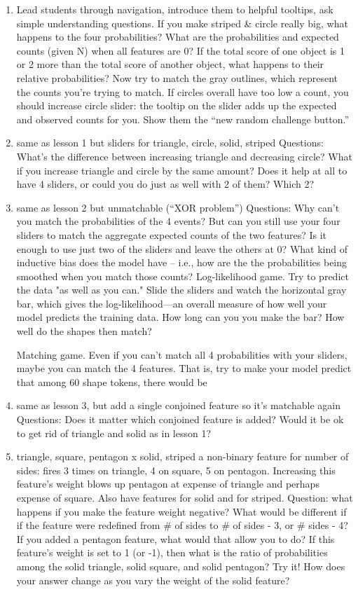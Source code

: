 \documentclass[11pt,letterpaper]{article}
\begin{document}
{\begin{enumerate}
\item 
 Lead students through navigation, introduce them to helpful tooltips, ask simple understanding questions. If you make striped \& circle really big, what happens to the four probabilities?  What are the probabilities and expected counts (given N) when all features are 0?  If the total score of one object is 1 or 2 more than the total score of another object, what happens to their relative probabilities? Now try to match the gray outlines, which represent the counts you’re trying to match.  If circles overall have too low a count, you should increase circle slider: the tooltip on the slider adds up the expected and observed counts for you.  Show them the “new random challenge button.”  
\item same as lesson 1 but sliders for triangle, circle, solid, striped
Questions: What’s the difference between increasing triangle and decreasing circle?  What if you increase triangle and circle by the same amount?  Does it help at all to have 4 sliders, or could you do just as well with 2 of them? Which 2?
\item same as lesson 2 but unmatchable (“XOR problem”)
Questions: Why can’t you match the probabilities of the 4 events? But can you still use your four sliders to match the aggregate expected counts of the two features?  Is it enough to use just two of the sliders and leave the others at 0?  What kind of inductive bias does the model have -- i.e., how are the the probabilities being smoothed when you match those counts?    
Log-likelihood game. Try to predict the data "as well as you can." Slide the sliders and watch the horizontal gray bar, which gives the log-likelihood—an overall measure of how well your model predicts the training data. How long can you you make the bar? How well do the shapes then match?

Matching game. Even if you can't match all 4 probabilities with your sliders, maybe you can match the 4 features. That is, try to make your model predict that among 60 shape tokens, there would be
\item same as lesson 3, but add a single conjoined feature so it’s matchable again Questions: Does it matter which conjoined feature is added?  Would it be ok to get rid of triangle and solid as in lesson 1?
\item {triangle, square, pentagon} x {solid, striped}
a non-binary feature for number of sides: fires 3 times on triangle, 4 on square, 5 on pentagon.  Increasing this feature’s weight blows up pentagon at expense of triangle and perhaps expense of square.  Also have features for solid and for striped.
Question: what happens if you make the feature weight negative?  What would be different if if the feature were redefined from \# of sides to \# of sides - 3, or \# sides - 4?  If you added a pentagon feature, what would that allow you to do?
If this feature's weight is set to 1 (or -1), then what is the ratio of probabilities among the solid triangle, solid square, and solid pentagon? Try it! How does your answer change as you vary the weight of the solid feature?


\end{enumerate}}
\end{document}
